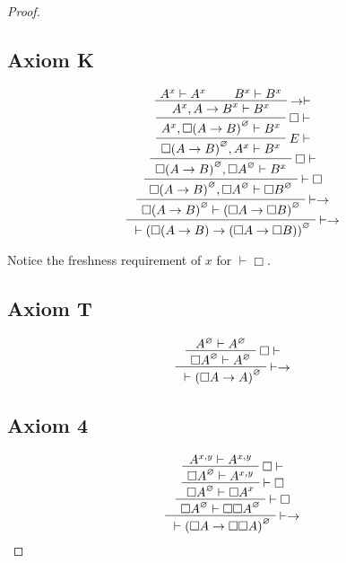 \documentclass{article}
\newcommand{\seq}[2]{{#1} \vdash{} {#2}}
\newcommand{\pf}[2]{{#1}^{#2}} %
\newcommand{\commento}[1]{}
\theoremstyle{definition}
\begin{document}
\begin{proof}
\subsection*{Axiom K}
\[
\AxiomC{$\seq{\pf{A}{x}}{\pf{A}{x}}$}
\AxiomC{$\seq{\pf{B}{x}}{\pf{B}{x}}$}
\RightLabel{$\rightarrow \vdash$}
\BinaryInfC{$\seq{\pf{A}{x}, \pf{A \rightarrow B}{x}}{\pf{B}{x}}$}
\RightLabel{$\Box \vdash$}
\UnaryInfC{$\seq{\pf{A}{x}, \pf{\Box(A \rightarrow B)}{\varnothing}}{\pf{B}{x}}$}
\RightLabel{$E\vdash$}
\UnaryInfC{$\seq{\pf{\Box(A \rightarrow B)}{\varnothing}, \pf{A}{x}}{\pf{B}{x}}$}
\RightLabel{$\Box \vdash$}
\UnaryInfC{$\seq{\pf{\Box(A \rightarrow B)}{\varnothing}, \pf{\Box A}{\varnothing}}{\pf{B}{x}}$}
\RightLabel{$\vdash \Box$}
\UnaryInfC{$\seq{\pf{\Box(A \rightarrow B)}{\varnothing}, \pf{\Box A}{\varnothing}}{\pf{\Box B}{\varnothing}}$}
\RightLabel{$\vdash \rightarrow$}
\UnaryInfC{$\seq{\pf{\Box(A \rightarrow B)}{\varnothing}}{\pf{(\Box A \rightarrow \Box B)}{\varnothing}}$}
\RightLabel{$\vdash \rightarrow$}
\UnaryInfC{$\seq{}{\pf{(\Box(A \rightarrow B) \rightarrow (\Box A \rightarrow \Box B))}{\varnothing}}$}
\DisplayProof
\]




Notice the freshness requirement of $x$ for $\vdash \Box$.
\subsection*{Axiom T}
\[
\AxiomC{$\seq{\pf{A}{\varnothing}}{\pf{A}{\varnothing}}$}
\RightLabel{$\Box \vdash$}
\UnaryInfC{$\seq{\pf{\Box A}{\varnothing}}{\pf{A}{\varnothing}}$}
\RightLabel{$\vdash \rightarrow$}
\UnaryInfC{$\seq{}{\pf{(\Box A \rightarrow A)}{\varnothing}}$}
\DisplayProof
\]

\subsection*{Axiom 4}
\[
\AxiomC{$\seq{\pf{A}{x,y}}{\pf{A}{x,y}}$}
\RightLabel{$\Box \vdash$}
\UnaryInfC{$\seq{\pf{\Box A}{\varnothing}}{\pf{A}{x,y}}$}
\RightLabel{$\vdash \Box$}
\UnaryInfC{$\seq{\pf{\Box A}{\varnothing}}{\pf{\Box A}{x}}$}
\RightLabel{$\vdash \Box$}
\UnaryInfC{$\seq{\pf{\Box A}{\varnothing}}{\pf{\Box \Box A}{\varnothing}}$}
\RightLabel{$\vdash \rightarrow$}
\UnaryInfC{$\seq{}{\pf{(\Box A \rightarrow \Box \Box A)}{\varnothing}}$}
\DisplayProof
\]



\end{proof}
\end{document}

